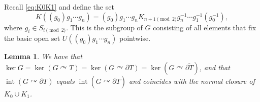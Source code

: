 \documentclass[a4paper]{amsart}
\theoremstyle{plain}
\newtheorem{lemma}[theorem]{Lemma}
\theoremstyle{definition}
\theoremstyle{remark}
\numberwithin{theorem}{section}
\begin{document}
Recall \eqref{eq:K0K1} and define the set
\begin{equation}\label{eq:fixators}
K((g_0)g_1\dotsm g_n)=(g_0)g_1\dotsm g_n K_{n+1\pmod 2} g_n^{-1}\dotsm g_1^{-1}(g_0^{-1}),
\end{equation}
where $g_i\in S_{i\pmod 2}$.
This is the subgroup of $G$ consisting of all elements that fix the basic open set $U((g_0)g_1\dotsm g_n)$ pointwise.

\begin{lemma}\label{lem:interior}
We have that $\ker G = \ker(G\curvearrowright T) = \ker(G\curvearrowright \partial T) = \ker(G\curvearrowright\overline{\partial T})$,
and that $\operatorname{int}(G\curvearrowright \partial T)$ equals $\operatorname{int}(G\curvearrowright\overline{\partial T})$ and coincides with the normal closure of $K_0 \cup K_1$.
\end{lemma}
\end{document}
